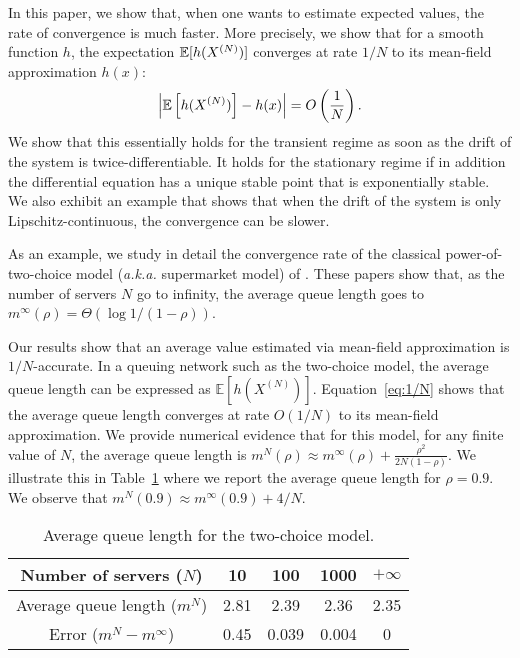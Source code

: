 \documentclass[sigconf]{acmart}
\newcommand\XN{X^{(N)}}
\newcommand\esp[1]{{\mathchoice{\besp{#1}}{\sesp{#1}}{\sesp{#1}}{\sesp{#1}}}}
\newcommand\besp[1]{\mathbb{E}\left[#1\right]}
\newcommand\sesp[1]{\mathbb{E}[#1]}
\newcommand\abs[1]{\left|#1\right|}
\newcommand\p[1]{\left(#1\right)}
\begin{document}
In this paper, we show that, when one wants to estimate expected
values, the rate of convergence is much faster. More precisely, we
show that for a smooth function $h$, the expectation $\esp{h(\XN)}$
converges at rate $1/N$ to its mean-field approximation $h(x)$:
\begin{align}
  \label{eq:1/N}
  \abs{\esp{h(\XN)} - h(x)} = O\p{\frac1N}.
\end{align}
We show that this essentially holds for the transient regime as soon
as the drift of the system is twice-differentiable. It holds for the
stationary regime if in addition the differential equation has a
unique stable point that is exponentially stable. We also exhibit an
example that shows that when the drift of the system is only
Lipschitz-continuous, the convergence can be slower.

As an example, we study in detail the convergence rate of the
classical power-of-two-choice model (\emph{a.k.a.} supermarket model)
of \cite{mitzenmacher1996power,vvedenskaya1996queueing}. These papers
show that, as the number of servers $N$ go to infinity, the average
queue length goes to $m^{\infty}(\rho)=\Theta(\log 1/(1-\rho))$.

Our results show that an average value estimated via mean-field
approximation is $1/N$-accurate.  In a queuing network such as the
two-choice model, the average queue length can be expressed as
$\sesp{h(\XN)}$.  Equation~\eqref{eq:1/N} shows that the average queue
length converges at rate $O(1/N)$ to its mean-field approximation.  We
provide numerical evidence that for this model, for any finite value
of $N$, the average queue length is
$ m^N(\rho) \approx m^{\infty}(\rho)+\frac{\rho^2}{2N(1-\rho)}$. We
illustrate this in Table~\ref{tab:power2} where we report the average
queue length for $\rho=0.9$. We observe that
$m^{N}(0.9)\approx m^{\infty}(0.9)+4/N$.

\begin{table}[ht]
  \centering
  \begin{tabular}{|c|c|c|c|c|}
    \hline
    Number of servers ($N$) & 10 & 100 & 1000 &$+\infty$\\\hline
    Average queue length ($m^N$) &2.81&2.39&2.36& 2.35\\\hline
    Error ($m^N-m^\infty$) & 0.45 & 0.039 & 0.004 & 0 \\\hline
  \end{tabular}
  \caption{Average queue length for the two-choice model. %
  }
  \label{tab:power2}
\end{table}




\end{document}

